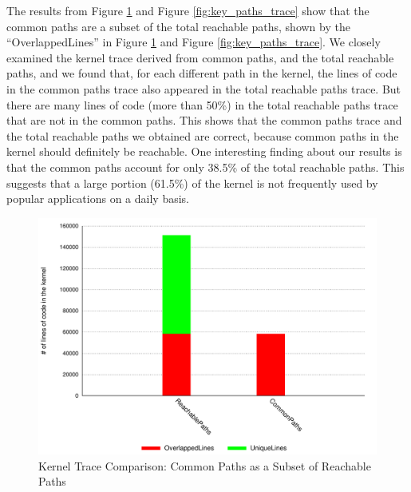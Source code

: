 The results from Figure \ref{fig:subset} and Figure
\ref{fig:key_paths_trace}  
show that the common paths are a subset of the
total reachable paths, 
shown by the ``OverlappedLines'' in Figure \ref{fig:subset} and Figure
\ref{fig:key_paths_trace}. 
We closely examined the kernel trace derived from common paths, 
and the total reachable paths, and we found that, for each different path
in the kernel, the lines of code 
in the common paths trace also appeared in the total reachable paths trace.
But there are many lines of code (more than 50\%) 
in the total reachable paths trace that are not in the common paths. This
shows that the common paths trace and 
the total reachable paths we obtained are correct, because common paths in
the kernel should definitely be reachable. 
One interesting finding about our results is that the common paths account
for only 38.5\% of the total reachable paths. 
This suggests that a large portion (61.5\%) of the kernel is not frequently
used by popular applications on a daily basis.

\begin{figure}
\centering
\includegraphics[width=1.0\columnwidth]{diagram/lind_oakland16_diagram_01.pdf}
\caption{Kernel Trace Comparison: Common Paths as a Subset of Reachable
Paths}
\label{fig:subset}
\end{figure}

